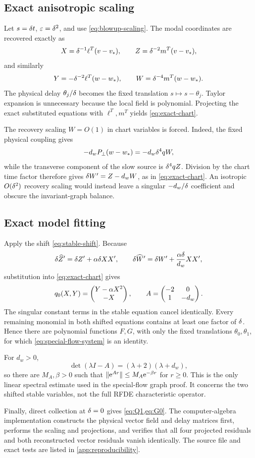 \subsection{Exact anisotropic scaling}

Let \(s=\delta t\), \(\varepsilon=\delta^2\), and use
\cref{eq:blowup-scaling}.  The modal coordinates are recovered exactly as
\[
 X=\delta^{-1}\ell^T(v-v_*),\qquad
 Z=\delta^{-2}m^T(v-v_*),
\]
and similarly
\[
 Y=-\delta^{-2}\ell^T(w-w_*),\qquad
 W=\delta^{-4}m^T(w-w_*).
\]
The physical delay \(\theta_j/\delta\) becomes the fixed translation
\(s\mapsto s-\theta_j\).  Taylor expansion is unnecessary because the local
field is polynomial.  Projecting the exact substituted equations with
\(\ell^T,m^T\) yields \cref{eq:exact-chart}.

The recovery scaling \(W=O(1)\) in chart variables is forced.  Indeed, the
fixed physical coupling gives
\[
 -d_wP_\perp(w-w_*)=-d_w\delta^4qW,
\]
while the transverse component of the slow source is
\(\delta^4qZ\).  Division by the chart time factor therefore gives
\(\delta W'=Z-d_wW\), as in \cref{eq:exact-chart}.  An isotropic
\(O(\delta^2)\) recovery scaling would instead leave a singular
\(-d_w/\delta\) coefficient and obscure the invariant-graph balance.

\subsection{Exact model fitting}

Apply the shift \cref{eq:stable-shift}.  Because
\[
 \delta\widehat Z'
 =\delta Z'+\alpha\delta X X',
 \qquad
 \delta\widehat W'
 =\delta W'+\frac{\alpha\delta}{d_w}XX',
\]
substitution into \cref{eq:exact-chart} gives
\[
 q_0(X,Y)=\begin{pmatrix}Y-\alpha X^2\\-X\end{pmatrix},
 \qquad
 A=\begin{pmatrix}-2&0\\1&-d_w\end{pmatrix}.
\]
The singular constant terms in the stable equation cancel identically.
Every remaining monomial in both shifted equations contains at least one
factor of \(\delta\).  Hence there are polynomial functions \(F,G\), with
only the fixed translations \(\theta_0,\theta_1\), for which
\cref{eq:special-flow-system} is an identity.

For \(d_w>0\),
\[
 \det(\lambda I-A)=(\lambda+2)(\lambda+d_w),
\]
so there are \(M_A,\beta>0\) such that
\(\|\mathrm e^{Ar}\|\le M_A\mathrm e^{-\beta r}\) for \(r\ge0\).  This is the only
linear spectral estimate used in the special-flow graph proof.  It concerns
the two shifted stable variables, not the full RFDE characteristic
operator.

Finally, direct collection at \(\delta=0\) gives \cref{eq:Q1,eq:G0}.  The
computer-algebra implementation constructs the physical vector field and
delay matrices first, performs the scaling and projections, and verifies
that all four projected residuals and both reconstructed vector residuals
vanish identically.  The source file and exact tests are listed in
\cref{app:reproducibility}.
